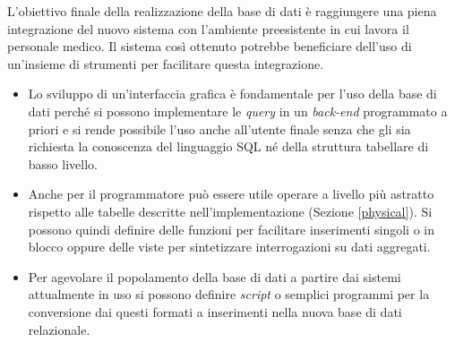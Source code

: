 L'obiettivo finale della realizzazione della base di dati è raggiungere una piena integrazione del nuovo sistema con l'ambiente preesistente in cui lavora il personale medico.
Il sistema così ottenuto potrebbe beneficiare dell'uso di un'insieme di strumenti per facilitare questa integrazione.
\begin{itemize}
\item Lo sviluppo di un'interfaccia grafica è fondamentale per l'uso della base di dati perché si possono implementare le \emph{query} in un \emph{back-end} programmato a priori e si rende possibile l'uso anche all'utente finale senza che gli sia richiesta la conoscenza del linguaggio SQL né della struttura tabellare di basso livello.
\item Anche per il programmatore può essere utile operare a livello più astratto rispetto alle tabelle descritte nell'implementazione (Sezione \ref{physical}). Si possono quindi definire delle funzioni per facilitare inserimenti singoli o in blocco oppure delle viste per sintetizzare interrogazioni su dati aggregati. 
\item Per agevolare il popolamento della base di dati a partire dai sistemi attualmente in uso si possono definire \emph{script} o semplici programmi per la conversione dai questi formati a inserimenti nella nuova base di dati relazionale.
\end{itemize}
